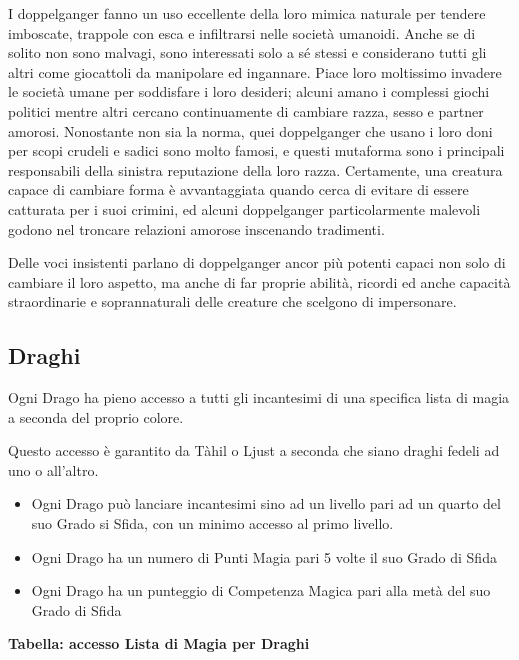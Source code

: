 \begin{multicols}{2}
	I doppelganger fanno un uso eccellente della loro mimica naturale per tendere imboscate, trappole con esca e infiltrarsi nelle società umanoidi. Anche se di solito non sono malvagi, sono interessati solo a sé stessi e considerano tutti gli altri come giocattoli da manipolare ed ingannare. Piace loro moltissimo invadere le società umane per soddisfare i loro desideri; alcuni amano i complessi giochi politici mentre altri cercano continuamente di cambiare razza, sesso e partner amorosi. Nonostante non sia la norma, quei doppelganger che usano i loro doni per scopi crudeli e sadici sono molto famosi, e questi mutaforma sono i principali responsabili della sinistra reputazione della loro razza. Certamente, una creatura capace di cambiare forma è avvantaggiata quando cerca di evitare di essere catturata per i suoi crimini, ed alcuni doppelganger particolarmente malevoli godono nel troncare relazioni amorose inscenando tradimenti.

	Delle voci insistenti parlano di doppelganger ancor più potenti capaci non solo di cambiare il loro aspetto, ma anche di far proprie abilità, ricordi ed anche capacità straordinarie e soprannaturali delle creature che scelgono di impersonare.


	\subsection{Draghi}

	Ogni Drago ha pieno accesso a tutti gli incantesimi di una specifica lista di magia a seconda del proprio colore.

	Questo accesso è garantito da Tàhil o Ljust a seconda che siano draghi fedeli ad uno o all'altro.

	\begin{itemize}
		\item Ogni Drago può lanciare incantesimi sino ad un livello pari ad un quarto del suo Grado si Sfida, con un minimo accesso al primo livello.
		\item Ogni Drago ha un numero di Punti Magia pari 5 volte il suo Grado di Sfida
		\item Ogni Drago ha un punteggio di Competenza Magica pari alla metà del suo Grado di Sfida
	\end{itemize}

	\medskip

	\textbf{Tabella: accesso Lista di Magia per Draghi}

	\medskip


\end{multicols}
